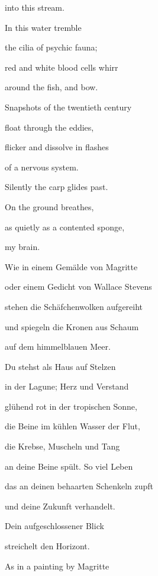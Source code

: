 \documentclass[a4paper]{article}
\begin{document}
into this stream.


\bigskip

In this water tremble

the cilia of psychic fauna;

red and white blood cells whirr

around the fish, and bow.


\bigskip

Snapshots of the twentieth century

float through the eddies,

flicker and dissolve in flashes

of a nervous system.


\bigskip

Silently the carp glides past.

On the ground breathes, 

as quietly as a contented sponge, 

my brain.



\bigskip


\bigskip

Wie in einem Gemälde von Magritte

oder einem Gedicht von Wallace Stevens

stehen die Schäfchenwolken aufgereiht

und spiegeln die Kronen aus Schaum

auf dem himmelblauen Meer.


\bigskip

Du stehst als Haus auf Stelzen

in der Lagune; Herz und Verstand

glühend rot in der tropischen Sonne,

die Beine im kühlen Wasser der Flut,

die Krebse, Muscheln und Tang 


\bigskip

an deine Beine spült. So viel Leben

das an deinen behaarten Schenkeln zupft 

und deine Zukunft verhandelt. 

Dein aufgeschlossener Blick 

streichelt den Horizont.



\bigskip

As in a painting by Magritte
\end{document}
